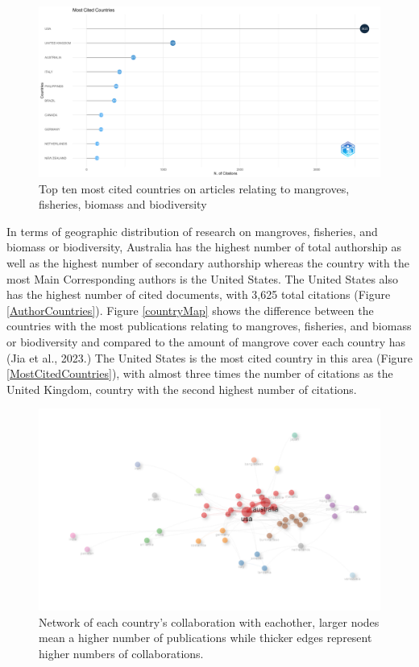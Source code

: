 \documentclass[
  12pt,
]{article}
\begin{document}
\begin{figure}
\includegraphics[width=1\linewidth]{MostCitedCountries} \caption{Top ten most cited countries on articles relating to mangroves, fisheries, biomass and biodiversity \label{MostCitedCountries}}\label{fig:MostCitedCountries}
\end{figure}



In terms of geographic distribution of research on mangroves, fisheries, and biomass or biodiversity, Australia has the highest number of total authorship as well as the highest number of secondary authorship whereas the country with the most Main Corresponding authors is the United States. The United States also has the highest number of cited documents, with 3,625 total citations (Figure \ref{AuthorCountries}). Figure \ref{countryMap} shows the difference between the countries with the most publications relating to mangroves, fisheries, and biomass or biodiversity and compared to the amount of mangrove cover each country has (Jia et al., 2023.) The United States is the most cited country in this area (Figure \ref{MostCitedCountries}), with almost three times the number of citations as the United Kingdom, country with the second highest number of citations.

\begin{figure}
\includegraphics[width=1\linewidth]{CountryCollaborationNetwork} \caption{Network of each country's collaboration with eachother, larger nodes mean a higher number of publications while thicker edges represent higher numbers of collaborations. \label{CountryCollaborationNetwork}}\label{fig:CountryCollaborationNetwork}
\end{figure}
\end{document}
